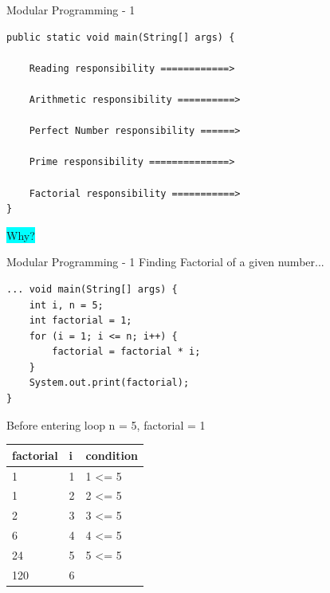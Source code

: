 \documentclass[14pt]{beamer}
\begin{document}
\begin{frame}[fragile]{Modular Programming - 1}
\begin{minipage}{7.5cm}
\begin{lstlisting}[numbers=none]
public static void main(String[] args) {
  
    Reading responsibility ============>

    Arithmetic responsibility ==========>

    Perfect Number responsibility ======>
    
    Prime responsibility ==============>

    Factorial responsibility ===========>
}
\end{lstlisting}
\end{minipage}
\quad
\begin{minipage}{2cm}
 \colorbox{cyan}{Why?}
\end{minipage}
\end{frame}

\begin{frame}[fragile]{Modular Programming - 1}
Finding Factorial of a given number...
 \begin{minipage}{5.5cm}
  \begin{lstlisting}[numbers=none]
... void main(String[] args) {
    int i, n = 5; 
    int factorial = 1;
    for (i = 1; i <= n; i++) {
        factorial = factorial * i;
    }
    System.out.print(factorial);
}
  \end{lstlisting}
 \end{minipage}
\quad
\begin{minipage}{4cm}
\begin{table}
 \tiny
 Before entering loop n = 5, factorial = 1
 \begin{tabular}{|p{1cm} | p{.5cm} | p{1.2cm} |}
 \hline
  \textbf{factorial} & \textbf{i} & \textbf{condition} \\ \hline
  1 & 1 & 1 <= 5 \\ \hline
  1 & 2 & 2 <= 5 \\ \hline
  2 & 3 & 3 <= 5 \\ \hline
  6 & 4 & 4 <= 5 \\ \hline
  24 & 5 & 5 <= 5 \\ \hline
  120 & 6 & \color{red}{6 <= 5} \\ \hline
 \end{tabular}
\end{table}
\end{minipage}
\end{frame}
\end{document}
